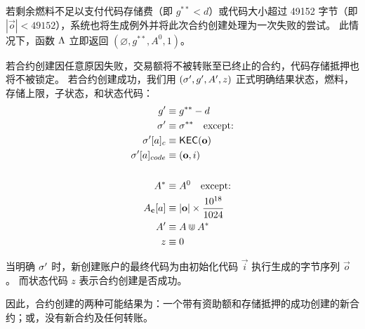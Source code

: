 若剩余燃料不足以支付代码存储费（即 $g^{**}<d$）或代码大小超过 49152 字节（即 $|\vec{o}|<49152$），系统也将生成例外并将此次合约创建处理为一次失败的尝试。
%
此情况下，函数 $\mathrm{\Lambda}$ 立即返回 $(\varnothing,g^{**},A^0,1)$。

若合约创建因任意原因失败，交易额将不被转账至已终止的合约，代码存储抵押也将不被锁定。
若合约创建成功，我们用 $\left(\mathbf{\sigma}', g', A', z\right)$  正式明确结果状态，燃料，存储上限，子状态，和状态代码：
\begin{align}
	g' &\equiv g^{**}-d \\
	\mathbf{\sigma}' &\equiv \mathbf{\sigma}^{**} \quad\mbox{except:} \\
		\mathbf{\sigma}'[a]_c &\equiv \mathsf{KEC}(\mathbf{o}) \\ 
		\mathbf{\sigma}'[a]_{code} &\equiv (\mathbf{o},i) \\
	\notag \\
	A^* &\equiv A^0 \quad\mbox{except:} \\
	A_{\bf c}[a] &\equiv |\mathbf{o}|\times \frac{10^{18}}{1024} \\
	A' &\equiv A \Cup A^{*} \\ 
	z &\equiv 0
\end{align}

当明确 $\mathbf{\sigma}'$ 时，新创建账户的最终代码为由初始化代码 $\vec{i}$ 执行生成的字节序列 $\vec{o}$。
而状态代码 $z$ 表示合约创建是否成功。

因此，合约创建的两种可能结果为：一个带有资助额和存储抵押的成功创建的新合约；或，没有新合约及任何转账。

